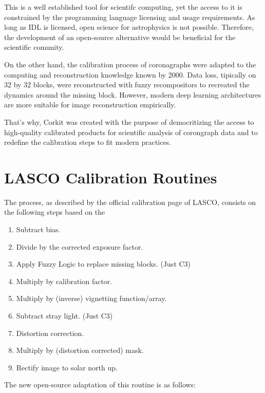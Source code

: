 \documentclass[draft]{agujournal2019}
\begin{document}
This is a well established tool for scientifc computing, yet the access to it is constrained by the programming language licensing and usage requirements. As long as IDL is licensed, open science for astrophysics is not possible. Therefore, the development of an open-source alternative would be beneficial for the scientific comunity.

On the other hand, the calibration process of coronagraphs were adapted to the computing and reconstruction knowledge known by 2000. Data loss, tipically on 32 by 32 blocks, were reconstructed with fuzzy recompositors to recreated the dynamics around the missing block. However, modern deep learning architectures are more suitable for image reconstruction empirically.

That's why, Corkit was created with the purpose of democritizing the access to high-quality calibrated products for scientific analysis of corongraph data and to redefine the calibration steps to fit modern practices.

\section{LASCO Calibration Routines}

The process, as described by the official calibration page of LASCO, consists on the following steps based on the %

\begin{enumerate}
    \item Subtract bias.
    \item Divide by the corrected exposure factor.
    \item Apply Fuzzy Logic to replace missing blocks. (Just C3)
    \item Multiply by calibration factor.
    \item Multiply by (inverse) vignetting function/array.
    \item Subtract stray light. (Just C3)
    \item Distortion correction.
    \item Multiply by (distortion corrected) mask.
    \item Rectify image to solar north up.
\end{enumerate}

The new open-source adaptation of this routine is as follows:
\end{document}
